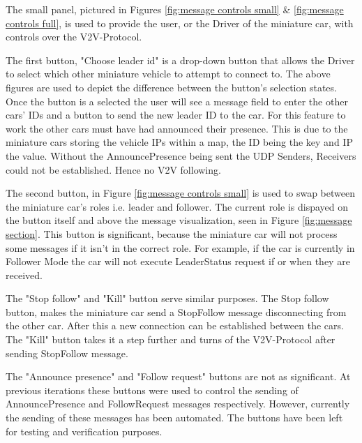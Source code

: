 \documentclass[12pt]{article}
\begin{document}
The small panel, pictured in Figures \ref{fig:message controls small} \& \ref{fig:message controls full}, is used to provide the user, or the Driver of the miniature car, with controls over the V2V-Protocol. \par

The first button, "Choose leader id" is a drop-down button that allows the Driver to select which other miniature vehicle to attempt to connect to. The above figures are used to depict the difference between the button's selection states. Once the button is a selected the user will see a message field to enter the other cars' IDs and a button to send the new leader ID to the car. For this feature to work the other cars must have had announced their presence. This is due to the miniature cars storing the vehicle IPs within a map, the ID being the key and IP the value. Without the AnnouncePresence being sent the UDP Senders, Receivers could not be established. Hence no V2V following.\par

The second button, in Figure \ref{fig:message controls small} is used to swap between the miniature car's roles i.e. leader and follower. The current role is dispayed on the button itself and above the message visualization, seen in Figure \ref{fig:message section}. This button is significant, because the miniature car will not process some messages if it isn't in the correct role. For example, if the car is currently in Follower Mode the car will not execute LeaderStatus request if or when they are received.\par

The "Stop follow" and "Kill" button serve similar purposes. The Stop follow button, makes the miniature car send a StopFollow message disconnecting from the other car. After this a new connection can be established between the cars. The "Kill" button takes it a step further and turns of the V2V-Protocol after sending StopFollow message.\par

The "Announce presence" and "Follow request" buttons are not as significant. At previous iterations these buttons were used to control the sending of AnnouncePresence and FollowRequest messages respectively. However, currently the sending of these messages has been automated. The buttons have been left for testing and verification purposes. \par

\end{document}
